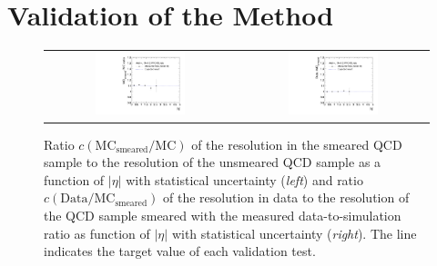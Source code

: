 \section{Validation of the Method}
\label{sec:jer_validation}
\begin{figure}[!tp]
  \centering
  \begin{tabular}{cc}
                \includegraphics[width=0.49\textwidth]{figures/ScalingFactorsVsEta_with_pli_PythiaSmearedVsPythia_v4b.pdf} &
                \includegraphics[width=0.49\textwidth]{figures/ScalingFactorsVsEta_with_pli_MCSmearedWithMeasuredValues_final_v4b.pdf}
  \end{tabular}
  \caption{Ratio $c\mathrm{(MC_{smeared}/MC)}$ of the resolution in the smeared QCD sample to the resolution of the unsmeared QCD sample as a function of $|\eta|$ with statistical uncertainty (\textit{left}) and ratio $c\mathrm{(Data/MC_{smeared})}$ of the resolution in data to the resolution of the QCD sample smeared with the measured data-to-simulation ratio as function of $|\eta|$ with statistical uncertainty (\textit{right}). The line indicates the target value of each validation test.}
  \label{fig:mc_closure}
\end{figure}
